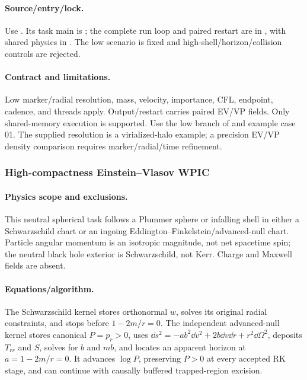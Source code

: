 \paragraph{Source/entry/lock.}
Use .  Its task main is
; the complete run
loop and paired restart are in
, with shared physics in
.  The low scenario is fixed and
high-shell/horizon/collision controls are rejected.
\paragraph{Contract and limitations.}
Low marker/radial resolution, mass, velocity, importance, CFL, endpoint,
cadence, and threads apply.  Output/restart carries paired EV/VP fields.
Only shared-memory execution is supported.  Use the low branch of
 and example case
01.  The supplied resolution is a virialized-halo example; a precision EV/VP
density comparison requires marker/radial/time refinement.

\subsubsection{High-compactness Einstein--Vlasov WPIC}
\paragraph{Physics scope and exclusions.}
This neutral spherical task follows a Plummer sphere or infalling shell in
either a Schwarzschild chart or an ingoing
Eddington--Finkelstein/advanced-null chart.  Particle angular momentum is an
isotropic magnitude, not net spacetime spin; the neutral black hole exterior
is Schwarzschild, not Kerr.  Charge and Maxwell fields are absent.
\paragraph{Equations/algorithm.}
The Schwarzschild kernel stores orthonormal \(w\), solves its original radial
constraints, and stops before \(1-2m/r=0\).  The independent advanced-null
kernel stores canonical \(P=p_r>0\), uses
\(\dd s^2=-ab^2\dd v^2+2b\dd v\dd r+r^2\dd\Omega^2\), deposits \(T_{rr}\)
and \(S\), solves for \(b\) and \(mb\), and locates an apparent horizon at
\(a=1-2m/r=0\).  It advances \(\log P\), preserving \(P>0\) at every accepted
RK stage, and can continue with causally buffered trapped-region excision.
